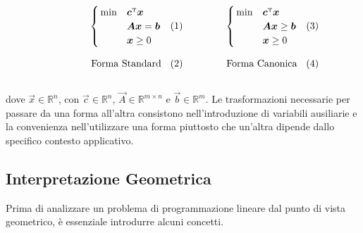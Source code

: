\begin{subequations}
\hspace*{.1\textwidth}
\begin{minipage}{.3\textwidth}
\begin{align}\notag
    \begin{cases}
        \,\min & \vec{c}^{\tr} \vec{x} \\
               & \vec{A} \vec{x} = \vec{b} \\\label{eq:LPstd}
             & \vec{x} \ge 0
    \end{cases}\\[7pt] \text{Forma Standard}
\end{align}
\end{minipage}\hspace{.1\textwidth}
\begin{minipage}{.3\textwidth}
    \begin{align}\notag
    \begin{cases}
        \,\min & \vec{c}^{\tr} \vec{x} \\
               & \vec{A} \vec{x} \ge \vec{b} \\\label{eq:LPcanonical}
             & \vec{x} \ge 0
    \end{cases}\\[7pt] \text{Forma Canonica}
\end{align}
\end{minipage}
\end{subequations}\\[10pt]
dove \( \vec{x} \in \mathbb{R}^n \), con \( \vec{c} \in \mathbb{R}^n \), \( \vec{A} \in \mathbb{R}^{m\times n} \) e \(
\vec{b} \in \mathbb{R}^m \). Le trasformazioni necessarie per passare da una forma all'altra consistono
nell'introduzione di variabili ausiliarie e la convenienza nell'utilizzare una forma piuttosto che un'altra dipende
dallo specifico contesto applicativo.

\subsection{Interpretazione Geometrica}
Prima di analizzare un problema di programmazione lineare dal punto di vista geometrico, è essenziale introdurre alcuni
concetti.


